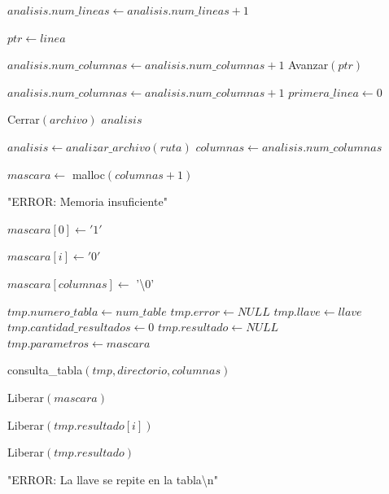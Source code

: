 \begin{tcolorbox}[colback=white, colframe=azul_unam, 
title=Pseudocódigo: funciones.c, breakable]
\begin{algorithmic}[1]
    \State $analisis.num\_lineas \gets analisis.num\_lineas + 1$


        \State $ptr \gets linea$

                \State $analisis.num\_columnas \gets analisis.num\_columnas + 1$
            \EndIf
            \State Avanzar$(ptr)$
        \EndWhile

        \State $analisis.num\_columnas \gets analisis.num\_columnas + 1$
        \State $primera\_linea \gets 0$

    \EndIf

\EndWhile

\State Cerrar$(archivo)$
\State \Return $analisis$

\EndProcedure

\vspace{0.3cm}



\State $analisis \gets analizar\_archivo(ruta)$
\State $columnas \gets analisis.num\_columnas$

\State $mascara \gets$ malloc$(columnas + 1)$

    \State \Return "ERROR: Memoria insuficiente"
\EndIf

\State $mascara[0] \gets '1'$

    \State $mascara[i] \gets '0'$
\EndFor

\State $mascara[columnas] \gets$ '\textbackslash 0'

\State $tmp.numero\_tabla \gets num\_table$
\State $tmp.error \gets NULL$
\State $tmp.llave \gets llave$
\State $tmp.cantidad\_resultados \gets 0$
\State $tmp.resultado \gets NULL$
\State $tmp.parametros \gets mascara$

\State consulta\_tabla$(tmp, directorio, columnas)$

\State Liberar$(mascara)$


        \State Liberar$(tmp.resultado[i])$
    \EndFor

    \State Liberar$(tmp.resultado)$

    \State \Return "ERROR: La llave se repite en la tabla\textbackslash n"


\end{algorithmic}
\end{tcolorbox}
